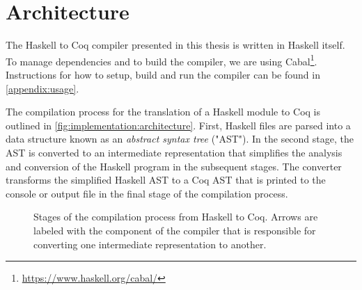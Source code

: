 \section{Architecture} \label{sec:implementation:architecture}
The Haskell to Coq compiler presented in this thesis is written in Haskell itself.
To manage dependencies and to build the compiler, we are using Cabal\footnote{\url{https://www.haskell.org/cabal/}}.
Instructions for how to setup, build and run the compiler can be found in \autoref{appendix:usage}.

The compilation process for the translation of a Haskell module to Coq is outlined in \autoref{fig:implementation:architecture}.
First, Haskell files are parsed into a data structure known as an \textit{abstract syntax tree} ("AST").
In the second stage, the AST is converted to an intermediate representation that simplifies the analysis and conversion of the Haskell program in the subsequent stages.
The converter transforms the simplified Haskell AST to a Coq AST that is printed to the console or output file in the final stage of the compilation process.

\begin{figure}[p]
  \caption{
    Stages of the compilation process from Haskell to Coq.
    Arrows are labeled with the component of the compiler that is responsible for converting one intermediate representation to another.
  }
  \label{fig:implementation:architecture}
\end{figure}

